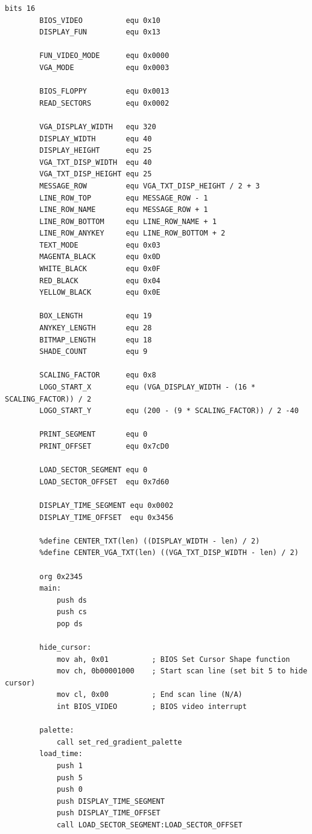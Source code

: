 \documentclass{article}
\begin{document}
    \begin{lstlisting}[caption={loaderV06.asm listing}, captionpos=t]
        bits 16
        BIOS_VIDEO          equ 0x10
        DISPLAY_FUN         equ 0x13

        FUN_VIDEO_MODE      equ 0x0000
        VGA_MODE            equ 0x0003

        BIOS_FLOPPY         equ 0x0013
        READ_SECTORS        equ 0x0002

        VGA_DISPLAY_WIDTH   equ 320
        DISPLAY_WIDTH       equ 40
        DISPLAY_HEIGHT      equ 25
        VGA_TXT_DISP_WIDTH  equ 40
        VGA_TXT_DISP_HEIGHT equ 25
        MESSAGE_ROW         equ VGA_TXT_DISP_HEIGHT / 2 + 3
        LINE_ROW_TOP        equ MESSAGE_ROW - 1
        LINE_ROW_NAME       equ MESSAGE_ROW + 1
        LINE_ROW_BOTTOM     equ LINE_ROW_NAME + 1
        LINE_ROW_ANYKEY     equ LINE_ROW_BOTTOM + 2
        TEXT_MODE           equ 0x03
        MAGENTA_BLACK       equ 0x0D
        WHITE_BLACK         equ 0x0F
        RED_BLACK           equ 0x04
        YELLOW_BLACK        equ 0x0E

        BOX_LENGTH          equ 19
        ANYKEY_LENGTH       equ 28
        BITMAP_LENGTH       equ 18
        SHADE_COUNT         equ 9

        SCALING_FACTOR      equ 0x8
        LOGO_START_X        equ (VGA_DISPLAY_WIDTH - (16 * SCALING_FACTOR)) / 2
        LOGO_START_Y        equ (200 - (9 * SCALING_FACTOR)) / 2 -40

        PRINT_SEGMENT       equ 0
        PRINT_OFFSET        equ 0x7cD0

        LOAD_SECTOR_SEGMENT equ 0
        LOAD_SECTOR_OFFSET  equ 0x7d60

        DISPLAY_TIME_SEGMENT equ 0x0002
        DISPLAY_TIME_OFFSET  equ 0x3456

        %define CENTER_TXT(len) ((DISPLAY_WIDTH - len) / 2)
        %define CENTER_VGA_TXT(len) ((VGA_TXT_DISP_WIDTH - len) / 2)

        org 0x2345
        main:
            push ds
            push cs
            pop ds

        hide_cursor:
            mov ah, 0x01          ; BIOS Set Cursor Shape function
            mov ch, 0b00001000    ; Start scan line (set bit 5 to hide cursor)
            mov cl, 0x00          ; End scan line (N/A)
            int BIOS_VIDEO        ; BIOS video interrupt

        palette:
            call set_red_gradient_palette
        load_time:
            push 1
            push 5
            push 0
            push DISPLAY_TIME_SEGMENT
            push DISPLAY_TIME_OFFSET
            call LOAD_SECTOR_SEGMENT:LOAD_SECTOR_OFFSET


\end{lstlisting}
\end{document}

